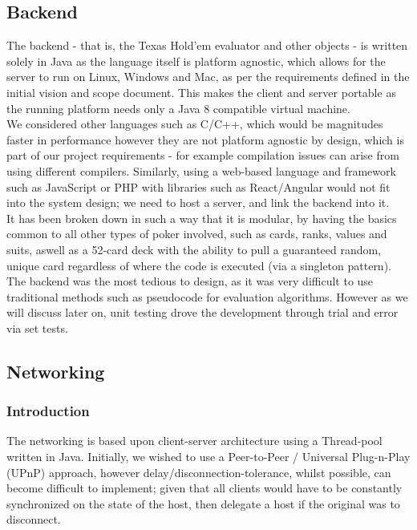 \documentclass[11pt]{article}
\begin{document}
\newpage
\subsection{Backend}

The backend - that is, the Texas Hold'em evaluator and other objects - is written solely in Java as the language itself is platform agnostic, which allows for the server to run on Linux, Windows and Mac, as per the requirements defined in the initial vision and scope document. This makes the client and server portable as the running platform needs only a Java 8 compatible virtual machine.  \\

We considered other languages such as C/C++, which would be magnitudes faster in performance however they are not platform agnostic by design, which is part of our project requirements - for example compilation issues can arise from using different compilers. Similarly, using a web-based language and framework such as JavaScript or PHP with libraries such as React/Angular would not fit into the system design; we need to host a server, and link the backend into it. \\


It has been broken down in such a way that it is modular, by having the basics common to all other types of poker involved, such as cards, ranks, values and suits, aswell as a 52-card deck with the ability to pull a guaranteed random, unique card regardless of where the code is executed (via a singleton pattern). \\



The backend was the most tedious to design, as it was very difficult to use traditional methods such as pseudocode for evaluation algorithms. However as we will discuss later on, unit testing drove the development through trial and error via set tests. 

\subsection{Networking}
\subsubsection{Introduction}
The networking is based upon client-server architecture using a Thread-pool written in Java. Initially, we wished to use a Peer-to-Peer / Universal Plug-n-Play (UPnP) approach, however delay/disconnection-tolerance, whilst possible, can become difficult to implement; given that all clients would have to be constantly synchronized on the state of the host, then delegate a host if the original was to disconnect. \\ %
\end{document}
